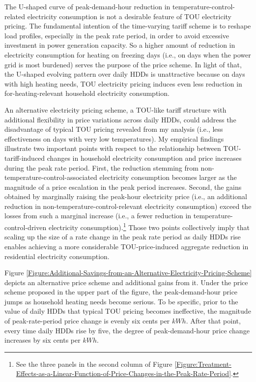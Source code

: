 The U-shaped curve of peak-demand-hour reduction in temperature-control-related electricity consumption is not a desirable feature of TOU electricity pricing. The fundamental intention of the time-varying tariff scheme is to reshape load profiles, especially in the peak rate period, in order to avoid excessive investment in power generation capacity. So a higher amount of reduction in electricity consumption for heating on freezing days (i.e., on days when the power grid is most burdened) serves the purpose of the price scheme. In light of that, the U-shaped evolving pattern over daily HDDs is unattractive because on days with high heating needs, TOU electricity pricing induces even less reduction in for-heating-relevant household electricity consumption. 

An alternative electricity pricing scheme, a TOU-like tariff structure with additional flexibility in price variations across daily HDDs, could address the disadvantage of typical TOU pricing revealed from my analysis (i.e., less effectiveness on days with very low temperatures). My empirical findings illustrate two important points with respect to the relationship between TOU-tariff-induced changes in household electricity consumption and price increases during the peak rate period. First, the reduction stemming from non-temperature-control-associated electricity consumption becomes larger as the magnitude of a price escalation in the peak period increases. Second, the gains obtained by marginally raising the peak-hour electricity price (i.e., an additional reduction in non-temperature-control-relevant electricity consumption) exceed the losses from such a marginal increase (i.e., a fewer reduction in temperature-control-driven electricity consumption).\footnote{See the three panels in the second column of Figure \ref{Figure:Treatment-Effects-as-a-Linear-Function-of-Price-Changes-in-the-Peak-Rate-Period}.} Those two points collectively imply that scaling up the size of a rate change in the peak rate period as daily HDDs rise enables achieving a more considerable TOU-price-induced aggregate reduction in residential electricity consumption. 
 
Figure \ref{Figure:Additional-Savings-from-an-Alternative-Electricity-Pricing-Scheme} depicts an alternative price scheme and additional gains from it. Under the price scheme proposed in the upper part of the figure, the peak-demand-hour price jumps as household heating needs become serious. To be specific, prior to the value of daily HDDs that typical TOU pricing becomes ineffective, the magnitude of peak-rate-period price change is evenly six cents per $kWh$. After that point, every time daily HDDs rise by five, the degree of peak-demand-hour price change increases by six cents per $kWh$. 

